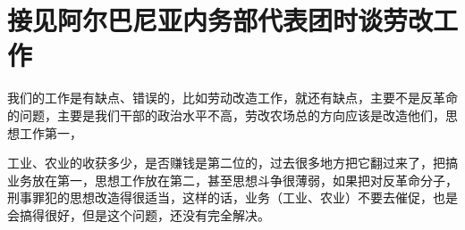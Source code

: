 \section[接见阿尔巴尼亚内务部代表团时谈劳改工作（一九六五年九月十八日）]{接见阿尔巴尼亚内务部代表团时谈劳改工作}


我们的工作是有缺点、错误的，比如劳动改造工作，就还有缺点，主要不是反革命的问题，主要是我们干部的政治水平不高，劳改农场总的方向应该是改造他们，思想工作第一，

工业、农业的收获多少，是否赚钱是第二位的，过去很多地方把它翻过来了，把搞业务放在第一，思想工作放在第二，甚至思想斗争很薄弱，如果把对反革命分子，刑事罪犯的思想改造得很适当，这样的话，业务（工业、农业）不要去催促，也是会搞得很好，但是这个问题，还没有完全解决。

